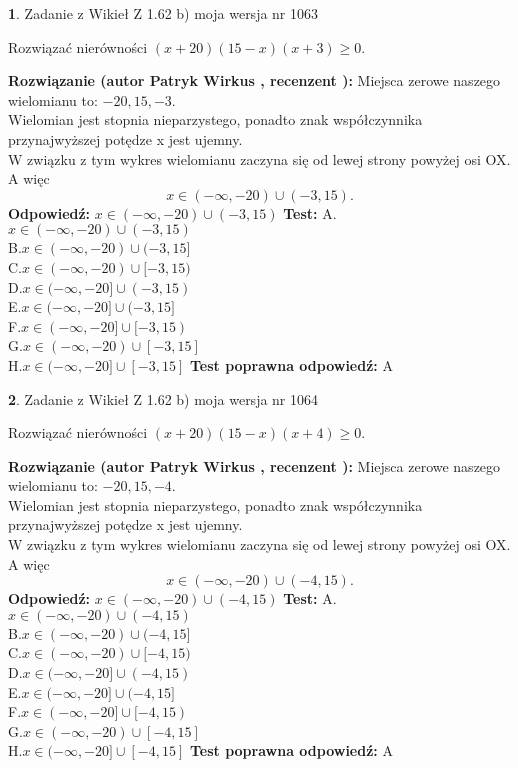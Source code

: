 \documentclass[12pt, a4paper]{article}
\theoremstyle{definition} %
\newtheorem{zad}{}
\newcommand{\zadStart}[1]{\begin{zad}#1\newline}
\newcommand{\zadStop}{\end{zad}}
\newcommand{\rozwStart}[2]{\noindent \textbf{Rozwiązanie (autor #1 , recenzent #2): }\newline}
\newcommand{\rozwStop}{\newline}
\newcommand{\odpStart}{\noindent \textbf{Odpowiedź:}\newline}
\newcommand{\odpStop}{\newline}
\newcommand{\testStart}{\noindent \textbf{Test:}\newline}
\newcommand{\testStop}{\newline}
\newcommand{\kluczStart}{\noindent \textbf{Test poprawna odpowiedź:}\newline}
\newcommand{\kluczStop}{\newline}
\begin{document}
\zadStart{Zadanie z Wikieł Z 1.62 b) moja wersja nr 1063}

Rozwiązać nierówności $(x+20)(15-x)(x+3)\ge0$.
\zadStop
\rozwStart{Patryk Wirkus}{}
Miejsca zerowe naszego wielomianu to: $-20, 15, -3$.\\
Wielomian jest stopnia nieparzystego, ponadto znak współczynnika przy\linebreak najwyższej potędze x jest ujemny.\\ W związku z tym wykres wielomianu zaczyna się od lewej strony powyżej osi OX. A więc $$x \in (-\infty,-20) \cup (-3,15).$$
\rozwStop
\odpStart
$x \in (-\infty,-20) \cup (-3,15)$
\odpStop
\testStart
A.$x \in (-\infty,-20) \cup (-3,15)$\\
B.$x \in (-\infty,-20) \cup (-3,15]$\\
C.$x \in (-\infty,-20) \cup [-3,15)$\\
D.$x \in (-\infty,-20] \cup (-3,15)$\\
E.$x \in (-\infty,-20] \cup (-3,15]$\\
F.$x \in (-\infty,-20] \cup [-3,15)$\\
G.$x \in (-\infty,-20) \cup [-3,15]$\\
H.$x \in (-\infty,-20] \cup [-3,15]$
\testStop
\kluczStart
A
\kluczStop



\zadStart{Zadanie z Wikieł Z 1.62 b) moja wersja nr 1064}

Rozwiązać nierówności $(x+20)(15-x)(x+4)\ge0$.
\zadStop
\rozwStart{Patryk Wirkus}{}
Miejsca zerowe naszego wielomianu to: $-20, 15, -4$.\\
Wielomian jest stopnia nieparzystego, ponadto znak współczynnika przy\linebreak najwyższej potędze x jest ujemny.\\ W związku z tym wykres wielomianu zaczyna się od lewej strony powyżej osi OX. A więc $$x \in (-\infty,-20) \cup (-4,15).$$
\rozwStop
\odpStart
$x \in (-\infty,-20) \cup (-4,15)$
\odpStop
\testStart
A.$x \in (-\infty,-20) \cup (-4,15)$\\
B.$x \in (-\infty,-20) \cup (-4,15]$\\
C.$x \in (-\infty,-20) \cup [-4,15)$\\
D.$x \in (-\infty,-20] \cup (-4,15)$\\
E.$x \in (-\infty,-20] \cup (-4,15]$\\
F.$x \in (-\infty,-20] \cup [-4,15)$\\
G.$x \in (-\infty,-20) \cup [-4,15]$\\
H.$x \in (-\infty,-20] \cup [-4,15]$
\testStop
\kluczStart
A
\kluczStop
\end{document}
